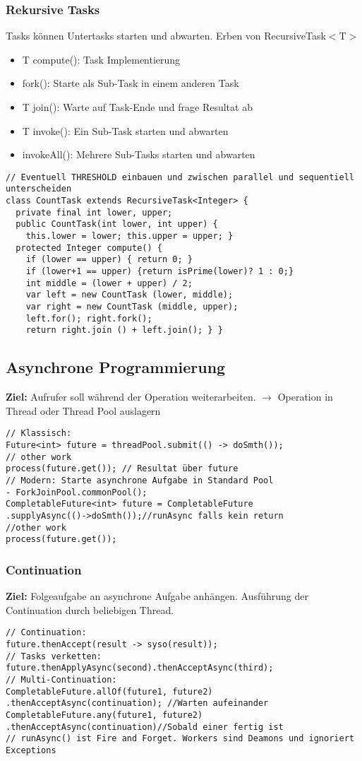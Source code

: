 \subsubsection{Rekursive Tasks}
Tasks können Untertasks starten und abwarten. Erben von RecursiveTask$<$T$>$
\begin{itemize}[topsep=0pt, leftmargin=3mm]
    \setlength\itemsep{-0.3em}
    \item T compute(): Task Implementierung
    \item fork(): Starte als Sub-Task in einem anderen Task
    \item T join(): Warte auf Task-Ende und frage Resultat ab
    \item T invoke(): Ein Sub-Task starten und abwarten
    \item invokeAll(): Mehrere Sub-Tasks starten und abwarten
\end{itemize}
\begin{lstlisting}
// Eventuell THRESHOLD einbauen und zwischen parallel und sequentiell unterscheiden
class CountTask extends RecursiveTask<Integer> {
  private final int lower, upper;
  public CountTask(int lower, int upper) {
    this.lower = lower; this.upper = upper; }
  protected Integer compute() {
    if (lower == upper) { return 0; }
    if (lower+1 == upper) {return isPrime(lower)? 1 : 0;}
    int middle = (lower + upper) / 2;
    var left = new CountTask (lower, middle);
    var right = new CountTask (middle, upper);
    left.for(); right.fork();
    return right.join () + left.join(); } }
\end{lstlisting}
\subsection{Asynchrone Programmierung}
\textcolor{b}{\textbf{Ziel:}} Aufrufer soll während der Operation weiterarbeiten. $\rightarrow$ Operation in Thread oder Thread Pool auslagern
\begin{lstlisting}
// Klassisch:
Future<int> future = threadPool.submit(() -> doSmth());
// other work
process(future.get()); // Resultat über future
// Modern: Starte asynchrone Aufgabe in Standard Pool
- ForkJoinPool.commonPool();
CompletableFuture<int> future = CompletableFuture
.supplyAsync(()->doSmth());//runAsync falls kein return
//other work
process(future.get());
\end{lstlisting}
\subsubsection{Continuation}
\textcolor{b}{\textbf{Ziel:}} Folgeaufgabe an asynchrone Aufgabe anhängen. Ausführung der Continuation durch beliebigen Thread.
\begin{lstlisting}
// Continuation:
future.thenAccept(result -> syso(result));
// Tasks verketten:
future.thenApplyAsync(second).thenAcceptAsync(third);
// Multi-Continuation:
CompletableFuture.allOf(future1, future2)
.thenAcceptAsync(continuation); //Warten aufeinander
CompletableFuture.any(future1, future2)
.thenAcceptAsync(continuation)//Sobald einer fertig ist
// runAsync() ist Fire and Forget. Workers sind Deamons und ignoriert Exceptions
\end{lstlisting}